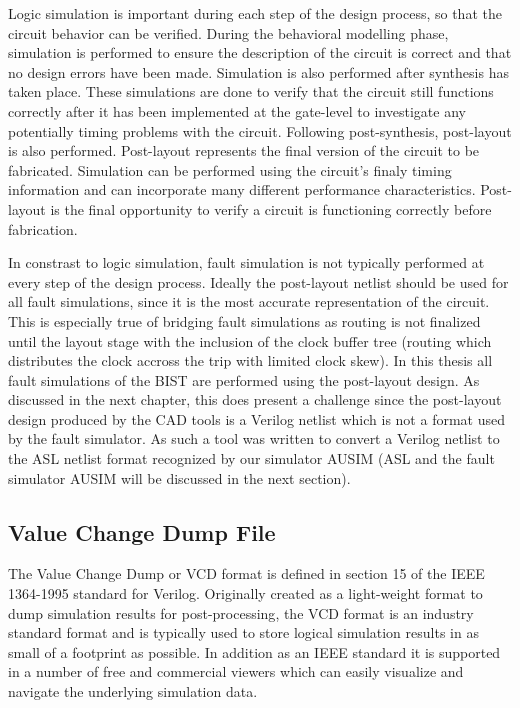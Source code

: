 \documentclass[12pt]{report}
\begin{document}
Logic simulation is important during each step of the design process, so that the circuit behavior can be verified.  During the behavioral modelling phase, simulation is performed to ensure the description of the circuit is correct and that no design errors have been made.  Simulation is also performed after synthesis has taken place.  These simulations are done to verify that the circuit still functions correctly after it has been implemented at the gate-level to investigate any potentially timing problems with the circuit.  Following post-synthesis, post-layout is also performed.  Post-layout represents the final version of the circuit to be fabricated.  Simulation can be performed using the circuit's finaly timing information and can incorporate many different performance characteristics.  Post-layout is the final opportunity to verify a circuit is functioning correctly before fabrication.

In constrast to logic simulation, fault simulation is not typically performed at every step of the design process.  Ideally the post-layout netlist should be used for all fault simulations, since it is the most accurate representation of the circuit.  This is especially true of bridging fault simulations as routing is not finalized until the layout stage with the inclusion of the clock buffer tree (routing which distributes the clock accross the trip with limited clock skew).  In this thesis all fault simulations of the BIST are performed using the post-layout design.  As discussed in the next chapter, this does present a challenge since the post-layout design produced by the CAD tools is a Verilog netlist which is not a format used by the fault simulator.  As such a tool was written to convert a Verilog netlist to the ASL netlist format recognized by our simulator AUSIM (ASL and the fault simulator AUSIM will be discussed in the next section).

\subsection{Value Change Dump File}
The Value Change Dump or VCD format is defined in section 15 of the IEEE 1364-1995 standard for Verilog\cite{verilog}.  Originally created as a light-weight format to dump simulation results for post-processing\cite{verilog}, the VCD format is an industry standard format and is typically used to store logical simulation results in as small of a footprint as possible\cite{verilog}.  In addition as an IEEE standard it is supported in a number of free and commercial viewers which can easily visualize and navigate the underlying simulation data.
\end{document}
